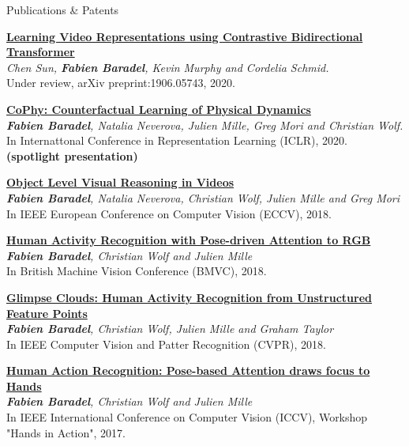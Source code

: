 \documentclass{resume} %
\begin{document}
\begin{rSection}{Publications \& Patents}
        \vspace{-1em}
        \item \href{https://arxiv.org/abs/1906.05743}{\textbf{Learning Video Representations using Contrastive Bidirectional Transformer}} \\
        \textit{Chen Sun, \textbf{Fabien Baradel}, Kevin Murphy and Cordelia Schmid.} \\ Under review, arXiv preprint:1906.05743, 2020. \vspace{0.3em}
        \item \href{https://openreview.net/forum?id=SkeyppEFvS}{\textbf{CoPhy: Counterfactual Learning of Physical Dynamics}} \\ \textit{\textbf{Fabien Baradel}, Natalia Neverova, Julien Mille, Greg Mori and Christian Wolf.} \\In Internattonal Conference in Representation Learning (ICLR), 2020. \textbf{(spotlight presentation)} \vspace{0.3em}
        \item \href{https://arxiv.org/abs/1806.06157}{\textbf{Object Level Visual Reasoning in Videos}} \\ \textit{\textbf{Fabien Baradel}, Natalia Neverova, Christian Wolf, Julien Mille and Greg Mori} \\ In IEEE European Conference on Computer Vision (ECCV), 2018. \vspace{0.3em}
        \item \href{https://hal.inria.fr/hal-01828083}{\textbf{Human Activity Recognition with Pose-driven Attention to RGB}} \\ \textit{\textbf{Fabien Baradel}, Christian Wolf and Julien Mille} \\ In British Machine Vision Conference (BMVC), 2018.
        \item \href{https://arxiv.org/abs/1802.07898}{\textbf{Glimpse Clouds: Human Activity Recognition from Unstructured Feature Points}} \\ \textit{\textbf{Fabien Baradel}, Christian Wolf, Julien Mille and Graham Taylor} \\ In IEEE Computer Vision and Patter Recognition (CVPR), 2018. \vspace{0.3em}
        \item \href{https://arxiv.org/abs/1712.08002}{\textbf{Human Action Recognition: Pose-based Attention draws focus to Hands}} \\ \textit{\textbf{Fabien Baradel}, Christian Wolf and Julien Mille} \\ In IEEE International Conference on Computer Vision (ICCV), Workshop "Hands in Action", 2017. \vspace{0.3em}

\end{rSection}
\end{document}

